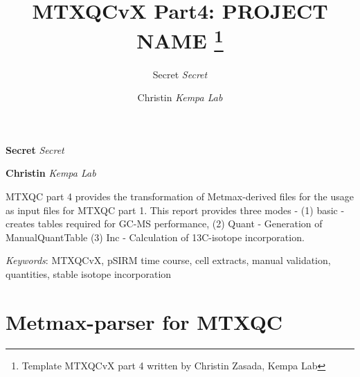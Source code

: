 \documentclass[9pt,]{article}
\title{MTXQCvX Part4: PROJECT NAME \thanks{Template MTXQCvX part 4 written by Christin Zasada, Kempa Lab}  }
\author{\Large Secret\vspace{0.05in} \newline\normalsize\emph{Secret}   \and \Large Christin\vspace{0.05in} \newline\normalsize\emph{Kempa Lab}  }
\date{}
\newcommand*{\authorfont}{\fontfamily{phv}\selectfont}
\renewenvironment{abstract}
 {{%
    \setlength{\leftmargin}{0mm}
    \setlength{\rightmargin}{\leftmargin}%
  }%
  \relax}
 {\endlist}
\begin{document}
	
%

{%
\setlength{\parindent}{0pt}
\thispagestyle{plain}
{\fontsize{18}{20}\selectfont\raggedright 
\maketitle  %

}

{
   \vskip 13.5pt\relax \normalsize\fontsize{11}{12} 
\textbf{\authorfont Secret} \hskip 15pt \emph{\small Secret}   \par \textbf{\authorfont Christin} \hskip 15pt \emph{\small Kempa Lab}   

}

}



{
\hypersetup{linkcolor=black}
\setcounter{tocdepth}{2}
\tableofcontents
}




\begin{abstract}

    \hbox{\vrule height .2pt width 39.14pc}

    \vskip 8.5pt %

\noindent MTXQC part 4 provides the transformation of Metmax-derived files for the
usage as input files for MTXQC part 1. This report provides three modes
- (1) basic - creates tables required for GC-MS performance, (2) Quant -
Generation of ManualQuantTable (3) Inc - Calculation of 13C-isotope
incorporation.


\vskip 8.5pt \noindent \emph{Keywords}: MTXQCvX, pSIRM time course, cell extracts, manual validation,
quantities, stable isotope incorporation \par

    \hbox{\vrule height .2pt width 39.14pc}



\end{abstract}


\vskip 6.5pt

\noindent  \section{Metmax-parser for MTXQC}\label{metmax-parser-for-mtxqc}
\end{document}
